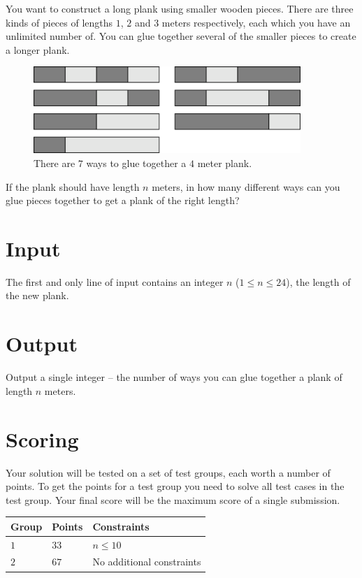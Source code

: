You want to construct a long plank using smaller wooden pieces.
There are three kinds of pieces of lengths $1$, $2$ and $3$ meters respectively, each which you have an unlimited number of.
You can glue together several of the smaller pieces to create a longer plank.

\begin{figure}[h!]
    \centering
    \includegraphics[width=0.9\textwidth]{plank.png}
    \caption{There are $7$ ways to glue together a $4$ meter plank.}
\end{figure}

If the plank should have length $n$ meters, in how many different ways can you glue pieces together to get a plank of the right length?

\section*{Input}
The first and only line of input contains an integer $n$ ($1 \le n \le 24$), the length of the new plank.

\section*{Output}
Output a single integer -- the number of ways you can glue together a plank of length $n$ meters.

\section*{Scoring}
Your solution will be tested on a set of test groups, each worth a number of points.
To get the points for a test group you need to solve all test cases in the test group. Your final score will be the maximum score of a single submission.

\noindent
\begin{tabular}{| l | l | l |}
  \hline
  Group & Points & Constraints \\ \hline
  $1$    & $33$        &  $n \le 10$ \\ \hline
  $2$    & $67$        &  No additional constraints \\ \hline
\end{tabular}
